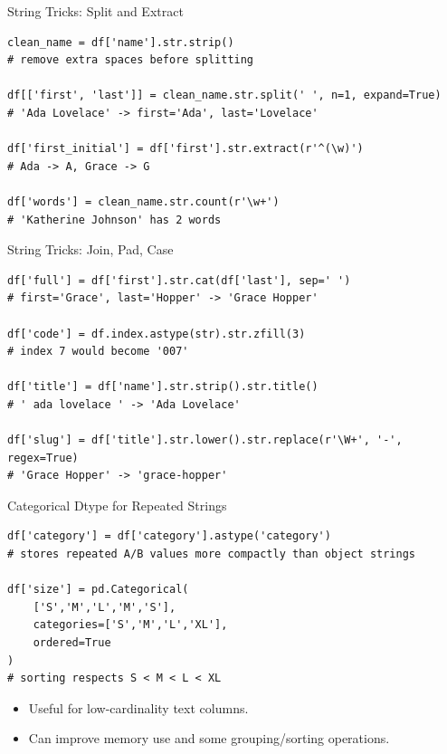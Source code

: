\documentclass[11pt,aspectratio=43]{beamer}
\begin{document}
\begin{frame}[fragile]{String Tricks: Split and Extract}
  \begin{lstlisting}
clean_name = df['name'].str.strip()
# remove extra spaces before splitting

df[['first', 'last']] = clean_name.str.split(' ', n=1, expand=True)
# 'Ada Lovelace' -> first='Ada', last='Lovelace'

df['first_initial'] = df['first'].str.extract(r'^(\w)')
# Ada -> A, Grace -> G

df['words'] = clean_name.str.count(r'\w+')
# 'Katherine Johnson' has 2 words
  \end{lstlisting}
\end{frame}

\begin{frame}[fragile]{String Tricks: Join, Pad, Case}
  \begin{lstlisting}
df['full'] = df['first'].str.cat(df['last'], sep=' ')
# first='Grace', last='Hopper' -> 'Grace Hopper'

df['code'] = df.index.astype(str).str.zfill(3)
# index 7 would become '007'

df['title'] = df['name'].str.strip().str.title()
# ' ada lovelace ' -> 'Ada Lovelace'

df['slug'] = df['title'].str.lower().str.replace(r'\W+', '-', regex=True)
# 'Grace Hopper' -> 'grace-hopper'
  \end{lstlisting}
\end{frame}

\begin{frame}[fragile]{Categorical Dtype for Repeated Strings}
  \begin{lstlisting}
df['category'] = df['category'].astype('category')
# stores repeated A/B values more compactly than object strings

df['size'] = pd.Categorical(
    ['S','M','L','M','S'],
    categories=['S','M','L','XL'],
    ordered=True
)
# sorting respects S < M < L < XL
  \end{lstlisting}
  \begin{itemize}
    \item Useful for low-cardinality text columns.
    \item Can improve memory use and some grouping/sorting operations.
  \end{itemize}
\end{frame}
\end{document}
